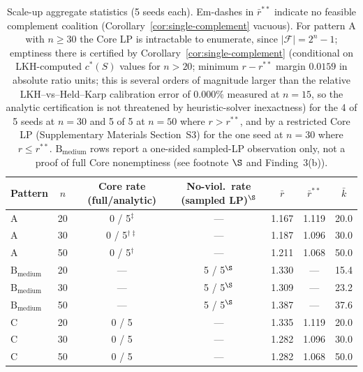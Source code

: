 \documentclass[11pt]{article}
\theoremstyle{plain}
\theoremstyle{definition}
\theoremstyle{remark}
\newcommand{\F}{\mathcal{F}}
\begin{document}
\begin{table}[t]
\centering
\caption{Scale-up aggregate statistics (5 seeds each). Em-dashes in $\bar r^{\ast\ast}$ indicate no feasible complement coalition (Corollary~\ref{cor:single-complement} vacuous). For pattern A with $n\ge 30$ the Core LP is intractable to enumerate, since $|\F|=2^n-1$; emptiness there is certified by Corollary~\ref{cor:single-complement} (conditional on LKH-computed $c^{\ast}(S)$ values for $n>20$; minimum $r-r^{\ast\ast}$ margin $0.0159$ in absolute ratio units; this is several orders of magnitude larger than the relative LKH--vs--Held--Karp calibration error of $0.000\%$ measured at $n=15$, so the analytic certification is not threatened by heuristic-solver inexactness) for the 4 of 5 seeds at $n=30$ and 5 of 5 at $n=50$ where $r>r^{\ast\ast}$, and by a restricted Core LP (Supplementary Materials Section~S3) for the one seed at $n=30$ where $r\le r^{\ast\ast}$. $\text{B}_{\text{medium}}$ rows report a one-sided sampled-LP observation only, not a proof of full Core nonemptiness (see footnote $\S$ and Finding~3(b)).}
\label{tab:scaleup}
\small
\begin{tabular}{@{}lcccccc@{}}
\toprule
Pattern & $n$ & Core rate (full/analytic) & No-viol.\ rate (sampled LP)$^{\S}$ & $\bar r$ & $\bar r^{\ast\ast}$ & $\bar k$ \\
\midrule
A                          & 20 & 0 / 5$^{\ddagger}$       & ---   & 1.167 & 1.119 & 20.0 \\
A                          & 30 & 0 / 5$^{\dagger\ddagger}$ & ---   & 1.187 & 1.096 & 30.0 \\
A                          & 50 & 0 / 5$^{\dagger}$         & ---   & 1.211 & 1.068 & 50.0 \\
\midrule
$\text{B}_{\text{medium}}$ & 20 & --- & 5 / 5$^{\S}$ & 1.330 & --- & 15.4 \\
$\text{B}_{\text{medium}}$ & 30 & --- & 5 / 5$^{\S}$ & 1.309 & --- & 23.2 \\
$\text{B}_{\text{medium}}$ & 50 & --- & 5 / 5$^{\S}$ & 1.387 & --- & 37.6 \\
\midrule
C                          & 20 & 0 / 5 & --- & 1.335 & 1.119 & 20.0 \\
C                          & 30 & 0 / 5 & --- & 1.282 & 1.096 & 30.0 \\
C                          & 50 & 0 / 5 & --- & 1.282 & 1.068 & 50.0 \\
\bottomrule
\end{tabular}


\end{table}
\end{document}

